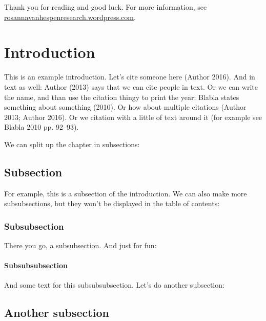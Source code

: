 \documentclass[
  12pt,
]{article}
\begin{document}
Thank you for reading and good luck. For more information, see
\href{http://rosannavanhespenresearch.wordpress.com}{rosannavanhespenresearch.wordpress.com}.

\newpage
{}
\setcounter{tocdepth}{2}
\tableofcontents

\newpage
{}

\newpage
{}

\hypertarget{introduction}{%
\section{\texorpdfstring{Introduction\label{label1}}{Introduction}}\label{introduction}}

This is an example introduction. Let's cite someone here (Author 2016).
And in text as well: Author (2013) says that we can cite people in text.
Or we can write the name, and than use the citation thingy to print the
year: Blabla states something about something (2010). Or how about
multiple citations (Author 2013; Author 2016). Or we citation with a
little of text around it (for example see Blabla 2010 pp. 92--93).

We can split up the chapter in subsections:

\hypertarget{subsection}{%
\subsection{Subsection}\label{subsection}}

For example, this is a subsection of the introduction. We can also make
more subsubsections, but they won't be displayed in the table of
contents:

\hypertarget{subsubsection}{%
\subsubsection{Subsubsection}\label{subsubsection}}

There you go, a subsubsection. And just for fun:

\hypertarget{subsubsubsection}{%
\paragraph{Subsubsubsection}\label{subsubsubsection}}

And some text for this subsubsubsection. Let's do another subsection:

\hypertarget{another-subsection}{%
\subsection{Another subsection}\label{another-subsection}}
\end{document}
